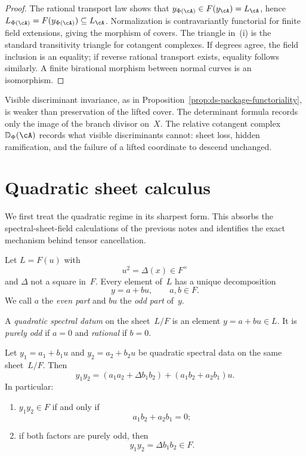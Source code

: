 \begin{proof}
The rational transport law shows that
$y_{\Phi(\cA)}\in F(y_{\cA})=L_{\cA}$, hence
$L_{\Phi(\cA)}=F(y_{\Phi(\cA)})\subseteq L_{\cA}$.  Normalization is
contravariantly functorial for finite field extensions, giving the morphism of
covers.  The triangle in~(i) is the standard transitivity triangle for
cotangent complexes.  If degrees agree, the field inclusion is an equality; if
reverse rational transport exists, equality follows similarly.  A finite
birational morphism between normal curves is an isomorphism.
\end{proof}

\begin{remark}
\label{rem:defect-vs-visible-invariance}
Visible discriminant invariance, as in
Proposition~\ref{prop:ds-package-functoriality}, is weaker than preservation of
the lifted cover.  The determinant formula records only the image of the branch
divisor on~$X$.  The relative cotangent complex $\mathbb D_{\Phi}(\cA)$ records
what visible discriminants cannot: sheet loss, hidden ramification, and the
failure of a lifted coordinate to descend unchanged.
\end{remark}

\section{Quadratic sheet calculus}
\label{sec:quadratic-sheet-calculus}

We first treat the quadratic regime in its sharpest form.  This absorbs the
spectral-sheet-field calculations of the previous notes and identifies the exact
mechanism behind tensor cancellation.

\begin{setup}
\label{setup:quadratic-sheet}
Let $L=F(u)$ with
\[
u^2=\Delta(x)\in F^{\times}
\]
and $\Delta$ not a square in~$F$.  Every element of~$L$ has a unique
decomposition
\[
y=a+b u,\qquad a,b\in F.
\]
We call $a$ the \emph{even part} and $bu$ the \emph{odd part} of~$y$.
\end{setup}

\begin{definition}
\label{def:quadratic-spectral-datum}
A \emph{quadratic spectral datum} on the sheet~$L/F$ is an element
$y=a+bu\in L$.  It is \emph{purely odd} if $a=0$ and \emph{rational} if
$b=0$.
\end{definition}

\begin{theorem}
\label{thm:quadratic-common-sheet-law}
Let $y_1=a_1+b_1u$ and $y_2=a_2+b_2u$ be quadratic spectral data on the same
sheet~$L/F$.  Then
\[
y_1y_2=(a_1a_2+\Delta b_1b_2)+(a_1b_2+a_2b_1)u.
\]
In particular:
\begin{enumerate}[label=\textup{(\roman*)}]
\item $y_1y_2\in F$ if and only if
\[
a_1b_2+a_2b_1=0;
\]
\item if both factors are purely odd, then
\[
y_1y_2=\Delta b_1b_2\in F.
\]
\end{enumerate}
\end{theorem}

